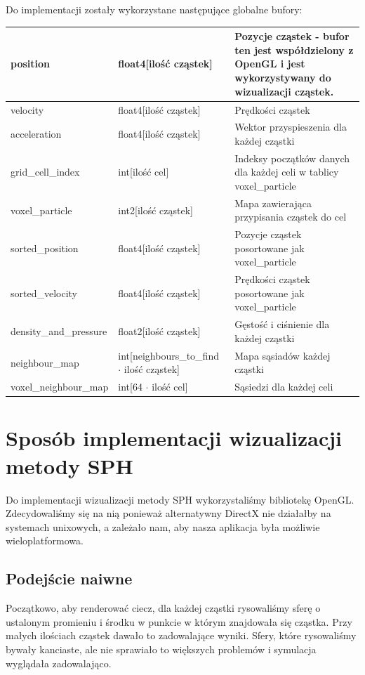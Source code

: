 \documentclass[polish, 12pt]{aghthesis}
\begin{document}
			\ \\
			\ \\
			Do implementacji zostały wykorzystane następujące globalne bufory:
			\ \\
			\begin{tabular}{| p{} | p{} | p{} |}
				\hline
					position & float4[ilość cząstek] & Pozycje cząstek - bufor ten jest współdzielony z OpenGL i jest wykorzystywany do wizualizacji cząstek. \\
				\hline
					velocity & float4[ilość cząstek] & Prędkości cząstek \\
				\hline
					acceleration & float4[ilość cząstek] & Wektor przyspieszenia dla każdej cząstki\\
				\hline
					grid\_cell\_index & int[ilość cel] & Indeksy początków danych dla każdej celi w tablicy voxel\_particle \\
				\hline
					voxel\_particle & int2[ilość cząstek] & Mapa zawierająca przypisania cząstek do cel \\ 
				\hline
					sorted\_position & float4[ilość cząstek] & Pozycje cząstek posortowane jak voxel\_particle\\
				\hline
					sorted\_velocity & float4[ilość cząstek] & Prędkości cząstek posortowane jak voxel\_particle\\
				\hline
					density\_and\_pressure & float2[ilość cząstek] & Gęstość i ciśnienie dla każdej cząstki\\
				\hline
					neighbour\_map & int[neighbours\_to\_find ${\cdot}$ ilość cząstek] & Mapa sąsiadów każdej cząstki\\
				\hline
					voxel\_neighbour\_map & int[64 ${\cdot}$ ilość cel] & Sąsiedzi dla każdej celi \\
				\hline
			\end{tabular}

\section{Sposób implementacji wizualizacji metody SPH}

	Do implementacji wizualizacji metody SPH wykorzystaliśmy bibliotekę OpenGL. Zdecydowaliśmy się na nią ponieważ alternatywny DirectX nie działałby na systemach unixowych, a zależało nam, aby nasza aplikacja była możliwie wieloplatformowa.
	
	\subsection{Podejście naiwne}
		Początkowo, aby renderować ciecz, dla każdej cząstki rysowaliśmy sferę o ustalonym promieniu i środku w punkcie w którym znajdowała się cząstka. Przy małych ilościach cząstek dawało to zadowalające wyniki. Sfery, które rysowaliśmy bywały kanciaste, ale nie sprawiało to większych problemów i symulacja wyglądała zadowalająco.
		
\end{document}
